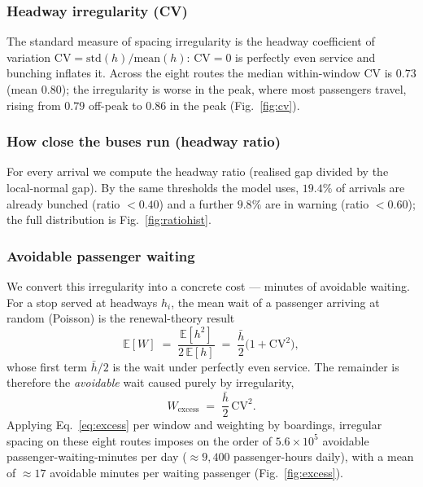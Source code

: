 \documentclass[final,5p,times,twocolumn,authoryear]{elsarticle}
\begin{document}
\subsubsection{Headway irregularity (CV)}
\label{sec:b-cv}
The standard measure of spacing irregularity is the headway coefficient of variation
$\mathrm{CV} = \mathrm{std}(h)/\mathrm{mean}(h)$: $\mathrm{CV}=0$ is perfectly even service and
bunching inflates it. Across the eight routes the median within-window $\mathrm{CV}$ is $0.73$
(mean $0.80$); the irregularity is worse in the peak, where most passengers travel, rising from
$0.79$ off-peak to $0.86$ in the peak (Fig.~\ref{fig:cv}).

\subsubsection{How close the buses run (headway ratio)}
\label{sec:b-ratio}
For every arrival we compute the headway ratio (realised gap divided by the local-normal gap). By the
same thresholds the model uses, $19.4\%$ of arrivals are already bunched (ratio $<0.40$) and a further
$9.8\%$ are in warning (ratio $<0.60$); the full distribution is Fig.~\ref{fig:ratiohist}.

\subsubsection{Avoidable passenger waiting}
\label{sec:b-wait}
We convert this irregularity into a concrete cost --- minutes of avoidable waiting. For a stop served
at headways $h_i$, the mean wait of a passenger arriving at random (Poisson) is the renewal-theory
result
\begin{equation}
\mathbb{E}[W] \;=\; \frac{\mathbb{E}[h^2]}{2\,\mathbb{E}[h]}
            \;=\; \frac{\bar h}{2}\bigl(1 + \mathrm{CV}^2\bigr),
\label{eq:wait}
\end{equation}
whose first term $\bar h/2$ is the wait under perfectly even service. The remainder is therefore the
\emph{avoidable} wait caused purely by irregularity,
\begin{equation}
W_{\mathrm{excess}} \;=\; \frac{\bar h}{2}\,\mathrm{CV}^2 .
\label{eq:excess}
\end{equation}
Applying Eq.~\eqref{eq:excess} per window and weighting by boardings, irregular spacing on these eight
routes imposes on the order of $5.6\times10^{5}$ avoidable passenger-waiting-minutes per day
($\approx 9{,}400$ passenger-hours daily), with a mean of $\approx 17$ avoidable minutes per waiting
passenger (Fig.~\ref{fig:excess}).
\end{document}
